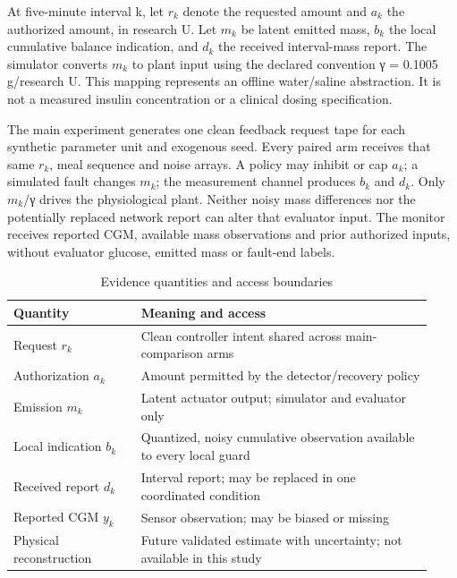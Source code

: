 \documentclass[journal,10pt,letterpaper]{IEEEtran}
\begin{document}
At five-minute interval k, let \(r_k\) denote the requested amount and
\(a_k\) the authorized amount, in research U. Let \(m_k\) be latent
emitted mass, \(b_k\) the local cumulative balance indication, and
\(d_k\) the received interval-mass report. The simulator converts
\(m_k\) to plant input using the declared convention γ = 0.1005
g/research U. This mapping represents an offline water/saline
abstraction. It is not a measured insulin concentration or a clinical
dosing specification.

The main experiment generates one clean feedback request tape for each
synthetic parameter unit and exogenous seed. Every paired arm receives
that same \(r_k\), meal sequence and noise arrays. A policy may inhibit
or cap \(a_k\); a simulated fault changes \(m_k\); the measurement
channel produces \(b_k\) and \(d_k\). Only \(m_k\)/γ drives the
physiological plant. Neither noisy mass differences nor the potentially
replaced network report can alter that evaluator input. The monitor
receives reported CGM, available mass observations and prior authorized
inputs, without evaluator glucose, emitted mass or fault-end labels.

\begin{table}[!t]
\centering
\caption{Evidence quantities and access boundaries}
\label{tab:1}
\small
\setlength{\tabcolsep}{3pt}
\renewcommand{\arraystretch}{1.17}
\begin{tabularx}{\linewidth}{>{\raggedright\arraybackslash}p{0.29\linewidth}>{\raggedright\arraybackslash}p{0.64\linewidth}}
\toprule
\textbf{Quantity} & \textbf{Meaning and access} \\
\midrule
Request \(r_k\) & Clean controller intent shared across main-comparison arms \\
Authorization \(a_k\) & Amount permitted by the detector/recovery policy \\
Emission \(m_k\) & Latent actuator output; simulator and evaluator only \\
Local indication \(b_k\) & Quantized, noisy cumulative observation available to every local guard \\
Received report \(d_k\) & Interval report; may be replaced in one coordinated condition \\
Reported CGM \(y_k\) & Sensor observation; may be biased or missing \\
Physical reconstruction & Future validated estimate with uncertainty; not available in this study \\
\bottomrule
\end{tabularx}
\end{table}
\end{document}
